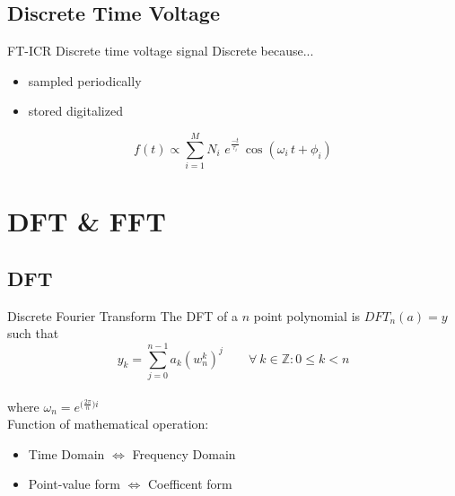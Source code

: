 \documentclass[t,compress,athserif,xcolor=pst,dvips]{beamer}
\begin{document}
	\subsection{Discrete Time Voltage}
	\begin{frame}{FT-ICR Discrete time voltage signal}
		\vspace{6pt} Discrete because... \\[3pt]
		\begin{itemize} \itemsep4pt
			\item sampled periodically
			\item stored digitalized
		\end{itemize} \vspace{1cm}
		$$f(t)\propto\sum_{i=1}^{M}{N_i\,\,e^{\frac{-t}{\tau_i}}\,\cos(\omega_i\,t+\phi_i)}$$
	\end{frame}
	
	\section{DFT \& FFT}
	
	\subsection{DFT}
	\begin{frame}{Discrete Fourier Transform}
		\vspace{6pt} The DFT of a $n$ point polynomial is $DFT_n(a)=y$ such that \\[4pt]
		$$y_k=\sum_{j=0}^{n-1}a_k(w_n^k)^j\qquad\forall~k\in\mathbb{Z}:0\le k < n$$ \vspace{10pt} \\
		where $\omega_n=e^{\big(\frac{2\pi}{n}\big)i}$ \\[12pt] \pause
		Function of mathematical operation:
		\begin{itemize} \itemsep2pt
			\item Time Domain $\Leftrightarrow$ Frequency Domain
			\item Point-value form $\Leftrightarrow$ Coefficent form
		\end{itemize}
	\end{frame}
	
\end{document}
